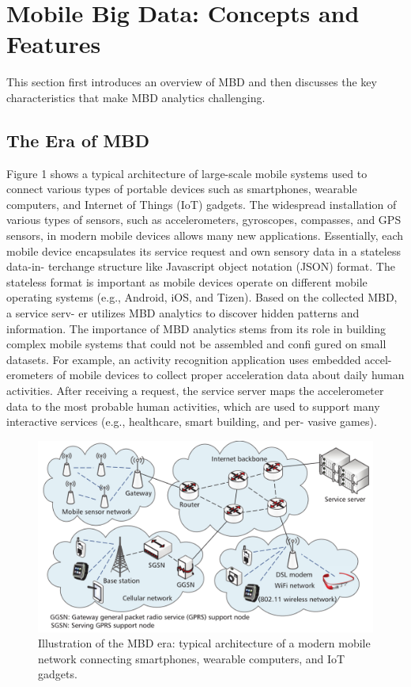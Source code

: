 \documentclass[14pt, a4paper]{extarticle}
\begin{document}
\section{Mobile Big Data: Concepts and Features}

This section first introduces an overview of MBD and then
discusses the key characteristics that make MBD analytics
challenging.

\subsection{The Era of MBD}

Figure 1 shows a typical architecture of large-scale mobile
systems used to connect various types of portable devices such
as smartphones, wearable computers, and Internet of Things
(IoT) gadgets. The widespread installation of various types
of sensors, such as accelerometers, gyroscopes, compasses,
and GPS sensors, in modern mobile devices allows many new
applications. Essentially, each mobile device encapsulates its
service request and own sensory data in a stateless data-in-
terchange structure like Javascript object notation (JSON)
format. The stateless format is important as mobile devices
operate on different mobile operating systems (e.g., Android,
iOS, and Tizen). Based on the collected MBD, a service serv-
er utilizes MBD analytics to discover hidden patterns and
information. The importance of MBD analytics stems from
its role in building complex mobile systems that could not be
assembled and confi gured on small datasets. For example, an
activity recognition application uses embedded accel-
erometers of mobile devices to collect proper acceleration
data about daily human activities. After receiving a request,
the service server maps the accelerometer data to the most
probable human activities, which are used to support many
interactive services (e.g., healthcare, smart building, and per-
vasive games).

\begin{figure}[!h]
	\centering
    \includegraphics[width=.8\linewidth]{mbd_architecture.png}
    \caption{Illustration of the MBD era: typical architecture of a modern mobile network connecting smartphones, wearable
computers, and IoT gadgets.}
\end{figure}
\end{document}

